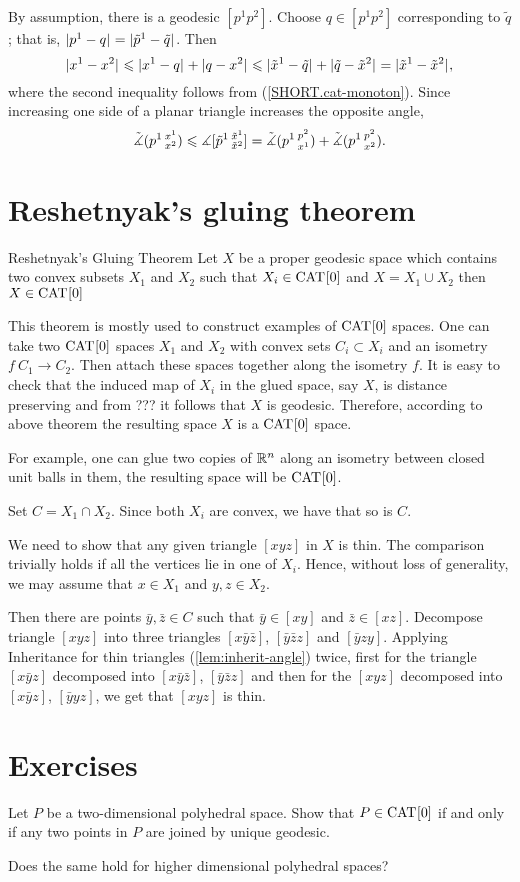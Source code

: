 By assumption, there is a geodesic $[p^1 p^2]$.
Choose $q\in[p^1 p^2]$ corresponding to $\tilde q$; 
that is, $\dist{p^1}{q}{}=\dist{\tilde p^1}{\tilde q}{}$.
Then 
\[\dist{x^1}{x^2}{} \le \dist{x^1}{q}{} + \dist{q}{x^2}{} \le \dist{\tilde x^1}{\tilde q}{} + \dist{\tilde q}{\tilde x^2}{} = \dist{\tilde x^1}{\tilde x^2}{},\]
where the second inequality follows from (\ref{SHORT.cat-monoton}). 
Since increasing one side of a planar triangle increases the opposite angle,
\begin{align*}
\angk{0} {p^1}{x^1}{x^2} \le  \mangle\hinge{ \tilde p^1}{ \tilde x^1}{ \tilde x^2}
= \angk{0} {p^1}{p^2}{x^1} + \angk{0} {p^1}{p^2}{x^2}.
\end{align*}
\qedsf



\section{Reshetnyak's gluing theorem}

\begin{thm}{Reshetnyak's Gluing Theorem}\label{thm:reshetnyak}
Let $X$ be a proper geodesic space which contains two convex subsets
$X_1$ and $X_2$ such that $X_i\in \CAT{}{0}$ and $X=X_1\cup X_2$ then $X\in\CAT{}{0}$
\end{thm}

This theorem is mostly used to construct examples
of $\CAT{}{0}$ spaces. One can take two $\CAT{}{0}$ spaces $X_1$ and $X_2$
with convex sets $C_i \subset X_i$ 
and an isometry $f\: C_1 \to C_2$.
Then attach these spaces together along the isometry $f$.
It is easy to check that the induced map of $X_i$ in the glued space, say $X$, 
is distance preserving and from ??? it follows that  
$X$ is geodesic. 
Therefore, according to above theorem the resulting space $X$ is a $\CAT{}{0}$ space.

For example, one can glue two copies of $\RR^n$ along an isometry between closed unit balls in them,
the resulting space will be $\CAT{}{0}$.


Set $C= X_1\cap X_2$.
Since both $X_i$ are convex, we have that so is $C$.

We need to show that any given triangle $[xyz]$ in $X$ is thin.
The comparison trivially holds if all the vertices lie in one of $X_i$.
Hence, without loss of generality, we may assume that $x\in X_1$ and $y,z\in X_2$.

Then there are points 
$\bar y,\bar z\in C$ such that
$\bar y\in [xy]$
and $\bar z\in [xz]$. 
Decompose triangle $[xyz]$ into three triangles $[x\bar y\bar z]$, $[\bar y\bar z z]$ and $[\bar y z y]$.
Applying Inheritance for thin triangles (\ref{lem:inherit-angle}) twice,
first for the triangle $[x\bar y z]$ decomposed into $[x\bar y\bar z]$, $[\bar y\bar z z]$
and then for  the $[x y z]$ decomposed into $[x\bar y z]$, $[\bar y y z]$,
we get that $[x y z]$ is thin. \qeds

\section*{Exercises}

\begin{pr}
Let $P$ be a two-dimensional polyhedral space.
Show that $P\in\CAT{}{0}$ 
if and only if any two points in $P$ are joined by unique geodesic. 

Does the same hold for higher dimensional polyhedral spaces?
\end{pr}
